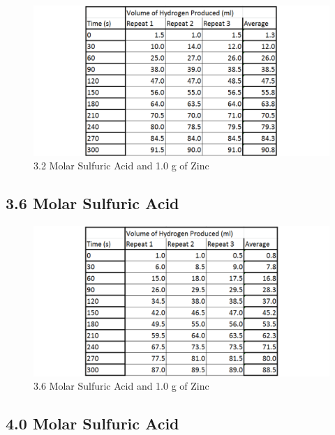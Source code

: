 \begin{figure}[H]
    \includegraphics[width=\textwidth]{./Experiment/Images/1NonCatalyst/32Molar.pdf}
    \caption{3.2 Molar Sulfuric Acid and 1.0 g of Zinc} \label{fig:32MolarSARawData}
\end{figure}

	\subsection{3.6 Molar Sulfuric Acid}

\begin{figure}[H]
    \includegraphics[width=\textwidth]{./Experiment/Images/1NonCatalyst/36Molar.pdf}
    \caption{3.6 Molar Sulfuric Acid and 1.0 g of Zinc} \label{fig:36MolarSARawData}
\end{figure}

	\subsection{4.0 Molar Sulfuric Acid}

